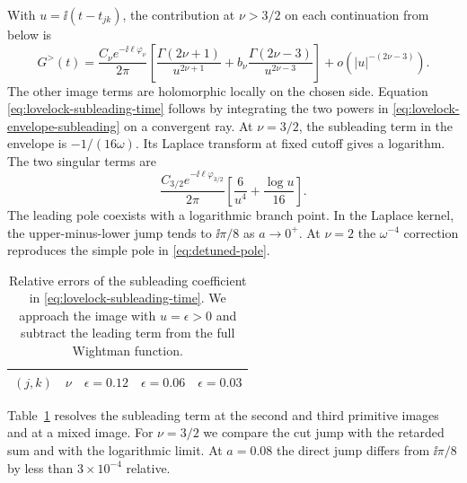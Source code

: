 With \(u=\ii(t-t_{jk})\), the contribution at \(\nu>3/2\)
on each continuation from below is
\begin{equation}
 G^>(t)=\frac{C_\nu e^{-\ii\ell\varphi_\nu}}{2\pi}
 \left[\frac{\Gamma(2\nu+1)}{u^{2\nu+1}}
       +b_\nu\frac{\Gamma(2\nu-3)}{u^{2\nu-3}}\right]
       +o\!\left(|u|^{-(2\nu-3)}\right).
 \label{eq:lovelock-subleading-time}
\end{equation}
The other image terms are holomorphic locally on the chosen
side. Equation \eqref{eq:lovelock-subleading-time} follows
by integrating the two powers in
\eqref{eq:lovelock-envelope-subleading} on a convergent ray.
At \(\nu=3/2\), the subleading term in the envelope is
\(-1/(16\omega)\). Its Laplace transform at fixed cutoff
gives a logarithm. The two singular terms are
\begin{equation}
 \frac{C_{3/2}e^{-\ii\ell\varphi_{3/2}}}{2\pi}
 \left[\frac{6}{u^4}+\frac{\log u}{16}\right].
 \label{eq:lovelock-half-integer-log}
\end{equation}
The leading pole coexists with a logarithmic branch point.
In the Laplace kernel, the upper-minus-lower jump tends to
\(\ii\pi/8\) as \(a\to0^+\). At \(\nu=2\) the
\(\omega^{-4}\) correction reproduces the simple pole in
\eqref{eq:detuned-pole}.

\begin{table}[t]
 \centering\small
 \begin{tabular}{ccccc}
 \hline
 \((j,k)\) & \(\nu\) & \(\epsilon=0.12\) & \(\epsilon=0.06\)
           & \(\epsilon=0.03\) \\
 \hline
 
 \end{tabular}
 \caption{Relative errors of the subleading coefficient in
 \eqref{eq:lovelock-subleading-time}. We approach the image with
 \(u=\epsilon>0\) and subtract the leading term from the full
 Wightman function.}
 \label{tab:lovelock-subleading-time}
\end{table}

Table~\ref{tab:lovelock-subleading-time} resolves the subleading
term at the second and third primitive images and at a mixed
image. For \(\nu=3/2\) we compare the cut jump with
the retarded sum and with the logarithmic limit. At \(a=0.08\)
the direct jump differs from \(\ii\pi/8\) by less than
\(3\times10^{-4}\) relative.
